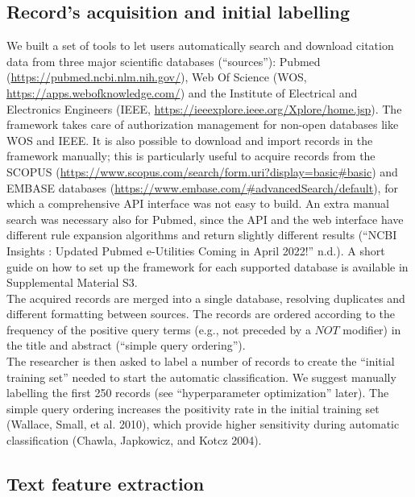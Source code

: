 \documentclass{article}
\begin{document}
\hypertarget{records-acquisition-and-initial-labelling}{%
\subsection{Record's acquisition and initial
labelling}\label{records-acquisition-and-initial-labelling}}

We built a set of tools to let users automatically search and download
citation data from three major scientific databases (``sources''):
Pubmed (\url{https://pubmed.ncbi.nlm.nih.gov/}), Web Of Science (WOS,
\url{https://apps.webofknowledge.com/}) and the Institute of Electrical
and Electronics Engineers (IEEE,
\url{https://ieeexplore.ieee.org/Xplore/home.jsp}). The framework takes
care of authorization management for non-open databases like WOS and
IEEE. It is also possible to download and import records in the
framework manually; this is particularly useful to acquire records from
the SCOPUS
(\url{https://www.scopus.com/search/form.uri?display=basic\#basic}) and
EMBASE databases
(\url{https://www.embase.com/\#advancedSearch/default}), for which a
comprehensive API interface was not easy to build. An extra manual
search was necessary also for Pubmed, since the API and the web
interface have different rule expansion algorithms and return slightly
different results ({``NCBI Insights : Updated Pubmed e-Utilities Coming
in April 2022!''} n.d.). A short guide on how to set up the framework
for each supported database is available in Supplemental Material S3.\\
The acquired records are merged into a single database, resolving
duplicates and different formatting between sources. The records are
ordered according to the frequency of the positive query terms (e.g.,
not preceded by a \(NOT\) modifier) in the title and abstract (``simple
query ordering'').\\
The researcher is then asked to label a number of records to create the
``initial training set'' needed to start the automatic classification.
We suggest manually labelling the first 250 records (see
``hyperparameter optimization'' later). The simple query ordering
increases the positivity rate in the initial training set (Wallace,
Small, et al. 2010), which provide higher sensitivity during automatic
classification (Chawla, Japkowicz, and Kotcz 2004).

\hypertarget{text-feature-extraction}{%
\subsection{Text feature extraction}\label{text-feature-extraction}}
\end{document}
